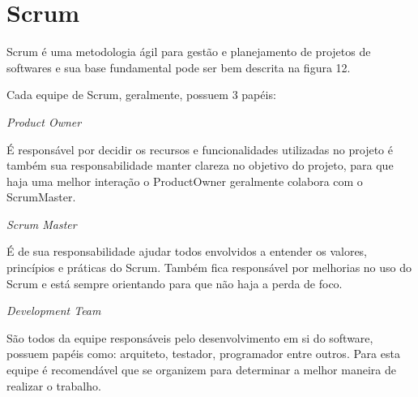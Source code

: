 \section{Scrum}
\label{sec:scrum}

Scrum é uma metodologia ágil para gestão e planejamento de projetos de softwares e sua base fundamental pode ser bem descrita na figura 12.

	\begin{figure}[h!]
		\centering
	\end{figure}

Cada equipe de Scrum, geralmente, possuem 3 papéis:
\begin{alineascomponto}
	\item \textit{Product Owner}
	
É responsável por decidir os recursos e funcionalidades utilizadas no projeto é também sua responsabilidade manter clareza no objetivo do projeto, para que haja uma melhor interação o ProductOwner geralmente colabora com o ScrumMaster.

	\item \textit{Scrum Master}
	
É de sua responsabilidade ajudar todos envolvidos a entender os valores, princípios e práticas do Scrum. Também fica responsável por melhorias no uso do Scrum e está sempre orientando para que não haja a perda de foco. 

	\item \textit{Development Team}
	
São todos da equipe responsáveis pelo desenvolvimento em si do software, possuem papéis como: arquiteto, testador, programador entre outros. Para esta equipe é recomendável que se organizem para determinar a melhor maneira de realizar o trabalho.
\pagebreak

	\end{alineascomponto}
	
